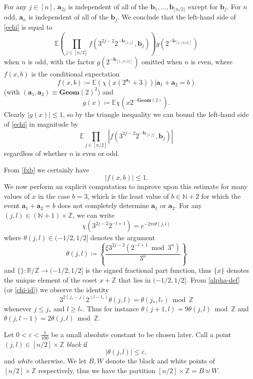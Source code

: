 \documentclass[12pt,a4paper,reqno]{amsart}
\numberwithin{equation}{section}
\theoremstyle{plain}
\theoremstyle{definition}
\newcommand\E{\mathbb{E}}
\newcommand\R{\mathbb{R}}
\newcommand\Z{\mathbb{Z}}
\newcommand\N{\mathbb{N}}
\renewcommand\a{\mathbf{a}}
\renewcommand\b{\mathbf{b}}
\newcommand\Geom{\mathbf{Geom}}
\newcommand\eps{\varepsilon}
\renewcommand{\mod}{\bmod}
\begin{document}
For any $j \in [n]$, $\a_{2j}$ is independent of all of the $\b_1,\dots,\b_{\lfloor n/2\rfloor}$ except for $\b_j$.  For $n$ odd, $\a_n$ is independent of all of the $\b_j$.  We conclude that the left-hand side of \eqref{echi} is equal to
$$ \E \left(\prod_{j \in [n/2]} f( 3^{2j-2} 2^{-\b_{[1,j]}}, \b_j )\right) g( 2^{-\b_{[1,\lfloor n/2\rfloor]}} )$$
when $n$ is odd, with the factor $g( 2^{-\b_{[1,\lfloor n/2\rfloor]}} )$ omitted when $n$ is even, where $f(x,b)$ is the conditional expectation
\begin{equation}\label{fxb}
 f( x, b ) \coloneqq \E \left( \chi( x (2^{\a_2}+3)) | \a_1 + \a_2 = b \right)
\end{equation}
(with $(\a_1,\a_2) \equiv \Geom(2)^2$) and
$$ g(x) \coloneqq \E \chi( x 2^{-\Geom(2)} ).$$
Clearly $|g(x)| \leq 1$, so by the triangle inequality we can bound the left-hand side of \eqref{echi} in magnitude by
$$ \E \prod_{j \in [n/2]} |f( 3^{2j-2} 2^{-\b_{[1,j]}}, \b_j )|$$
regardless of whether $n$ is even or odd.

From \eqref{fxb} we certainly have 
\begin{equation}\label{fxb-triv}
|f(x,b)| \leq 1.
\end{equation}
We now perform an explicit computation to improve upon this estimate for many values of $x$ in the case $b = 3$, which is the least value of $b \in \N+2$ for which the event $\a_1+\a_2=b$ does not completely determine $\a_1$ or $\a_2$.  For any $(j,l) \in (\N+1) \times \Z$, we can write
\begin{equation}\label{chi-id}
\chi( 3^{2j-2} 2^{-l+1} ) = e^{-2\pi i \theta(j,l)}
\end{equation}
where $\theta(j,l) \in (-1/2,1/2]$ denotes the argument
\begin{equation}\label{alpha-def}
 \theta(j,l) \coloneqq \left\{ \frac{\xi 3^{2j-2} (2^{-l+1} \mod 3^n)}{3^n} \right\}
\end{equation}
and $\{\}\colon \R/\Z \to (-1/2,1/2]$ is the signed fractional part function, thus $\{x\}$ denotes the unique element of the coset $x + \Z$ that lies in $(-1/2,1/2]$. 
From \eqref{alpha-def} (or \eqref{chi-id}) we observe the identity
\begin{equation}\label{ide}
 3^{2(j_*-j)} 2^{(l-l_*)} \theta(j,l) = \theta(j_*,l_*) \mod \Z 
\end{equation}
whenever $j \leq j_*$ and $l \geq l_*$.  Thus for instance $\theta(j+1,l) = 9\theta(j,l) \mod \Z$ and $\theta(j,l-1) = 2 \theta(j,l) \mod \Z$.

Let $0 < \eps < \frac{1}{100}$ be a small absolute constant to be chosen later.
Call a point $(j,l) \in [n/2] \times \Z$ \emph{black} if
\begin{equation}\label{wh}
|\theta(j,l)| \leq \eps,
\end{equation}
and \emph{white} otherwise.  We let $B, W$ denote the black and white points of $[n/2] \times \Z$ respectively, thus we have the partition $[n/2] \times \Z = B \uplus W$.
\end{document}
